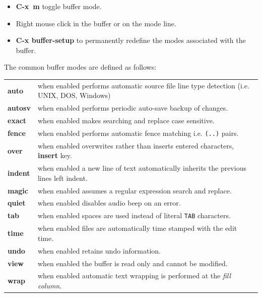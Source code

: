 \documentclass[11pt,a4paper,pdftex]{article}
\begin{document}
  \begin{itemize}
    {\setlength{\itemsep}{0ex}}
    \item \textbf{C-x~m} toggle buffer mode.
    \item Right mouse click in the buffer or on the mode line.
    \item \textbf{C-x buffer-setup} to permanently redefine the modes
    associated with the buffer.
  \end{itemize}

  The common buffer modes are defined as follows:

  \begin{longtable}{l@{\ --\ }p{5.8in}}
    \endhead
    \endfoot
    \endlastfoot

    \textbf{auto} & when enabled performs automatic source file line type
    detection (i.e. UNIX, DOS, Windows) \\

    \textbf{autosv} & when enabled performs periodic auto-save backup of
    changes.\\

    \textbf{exact} & when enabled makes searching and replace case
    sensitive.\\

    \textbf{fence} & when enabled performs automatic fence matching i.e.
    \texttt{(..)} pairs.\\

    \textbf{over} & when enabled overwrites rather than inserts entered
    characters, \textbf{insert} key.\\

    \textbf{indent} & when enabled a new line of text automatically inherits
    the previous lines left indent.\\

    \textbf{magic} & when enabled assumes a regular expression search and
    replace.\\

    \textbf{quiet} & when enabled disables audio beep on an error.\\

    \textbf{tab} & when enabled spaces are used instead of literal
    \texttt{TAB} characters.\\

    \textbf{time} & when enabled files are automatically time stamped with
    the edit time.\\

    \textbf{undo} & when enabled retains undo information.\\

    \textbf{view} & when enabled the buffer is read only and cannot be
    modified.\\

    \textbf{wrap} & when enabled automatic text wrapping is performed at the
    \textit{fill column}.\\

  \end{longtable}
\end{document}
